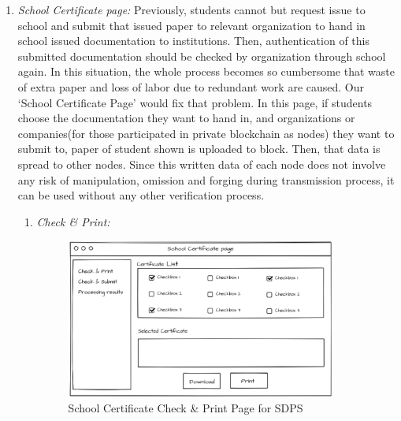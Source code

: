 \documentclass[conference]{IEEEtran}
\begin{document}
\begin{enumerate}
    \item \textit {School Certificate page: }Previously, students cannot but request issue to school and submit that issued paper to relevant organization to hand in school issued documentation to institutions. Then, authentication of this submitted documentation should be checked by organization through school again. In this situation, the whole process becomes so cumbersome that waste of extra paper and loss of labor due to redundant work are caused. Our ‘School Certificate Page’ would fix that problem. In this page, if students choose the documentation they want to hand in, and organizations or companies(for those participated in private blockchain as nodes) they want to submit to, paper of student shown is uploaded to block. Then, that data is spread to other nodes. Since this written data of each node does not involve any risk of manipulation, omission and forging during transmission process, it can be used without any other verification process.\\
    \vspace{10mm}
    \begin{enumerate}
    	\item \textit{Check \& Print: }
	    \begin{figure}[htbp]
	\centerline{\includegraphics[width=89mm,scale=0.5]{student/certificate_check_and_print.png}}
	\caption{School Certificate Check \& Print Page for SDPS}
	\label{fig}
	\end{figure}
	

\end{enumerate}
\end{enumerate}
\end{document}
